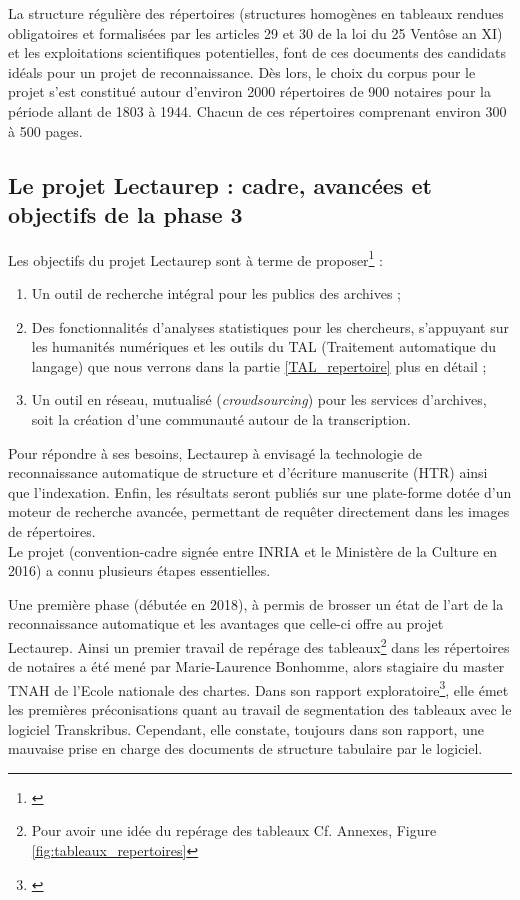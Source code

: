 La structure régulière des répertoires (structures homogènes en tableaux rendues obligatoires et formalisées par les articles 29 et 30 de la loi du 25 Ventôse an XI) et les exploitations scientifiques potentielles, font de ces documents des candidats idéals pour un projet de reconnaissance. Dès lors, le choix du corpus pour le projet s'est constitué autour d'environ 2000 répertoires de 900 notaires pour la période allant de 1803 à 1944. Chacun de ces répertoires comprenant environ 300 à 500 pages.

\subsection{Le projet Lectaurep : cadre, avancées et objectifs de la phase 3}

Les objectifs du projet Lectaurep sont à terme de proposer\footnote{\cite{chague_lectaurep_2019}} :
\begin{enumerate}
    \item Un outil de recherche intégral pour les publics des archives ;
    \item Des fonctionnalités d'analyses statistiques pour les chercheurs, s'appuyant sur les humanités numériques et les outils du TAL (Traitement automatique du langage) que nous verrons dans la partie \ref{TAL_repertoire} plus en détail ;
    \item Un outil en réseau, mutualisé (\textit{crowdsourcing}) pour les services d'archives, soit la création d'une communauté autour de la transcription. 
\end{enumerate}

Pour répondre à ses besoins, Lectaurep à envisagé la technologie de reconnaissance automatique de structure et d'écriture manuscrite (HTR) ainsi que l'indexation. Enfin, les résultats seront publiés sur une plate-forme dotée d'un moteur de recherche avancée, permettant de requêter directement dans les images de répertoires.\\

Le projet (convention-cadre signée entre INRIA et le Ministère de la Culture en 2016) a connu plusieurs étapes essentielles.

Une première phase (débutée en 2018), à permis de brosser un état de l'art de la reconnaissance automatique et les avantages que celle-ci offre au projet Lectaurep. Ainsi un premier travail de repérage des tableaux\footnote{Pour avoir une idée du repérage des tableaux Cf. Annexes, Figure \ref{fig:tableaux_repertoires}} dans les répertoires de notaires a été mené par Marie-Laurence Bonhomme, alors stagiaire du master TNAH de l'Ecole nationale des chartes. Dans son rapport exploratoire\footnote{\cite{bonhomme_repertoire_2018}}, elle émet les premières préconisations quant au travail de segmentation des tableaux avec le logiciel Transkribus. Cependant, elle constate, toujours dans son rapport, une mauvaise prise en charge des documents de structure tabulaire par le logiciel.\\ 

